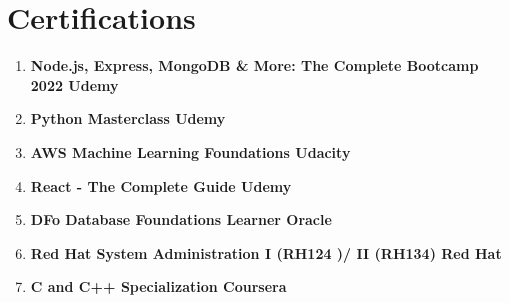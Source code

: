 \documentclass[letterpaper,11pt]{article}
\newcommand{\rside}[1]{
  \hfill {\small\color{accent} #1}%
}
\begin{document}
\section{Certifications}
\begin{enumerate}[label=\null, left=0pt..0pt, itemsep=0pt]
  \item \textbf{Node.js, Express, MongoDB \& More: The Complete Bootcamp 2022\rside{Udemy}}
  \item \textbf{Python Masterclass \rside{Udemy}}
  \item \textbf{AWS Machine Learning Foundations\rside{Udacity}}
  \item \textbf{React - The Complete Guide \rside{Udemy}}
  \item \textbf{DFo Database Foundations Learner \rside{Oracle}}
  \item \textbf{Red Hat System Administration I (RH124 )/ II (RH134) \rside{Red Hat}}
  \item \textbf{C and C++ Specialization \rside{Coursera}}
\end{enumerate}
\end{document}
